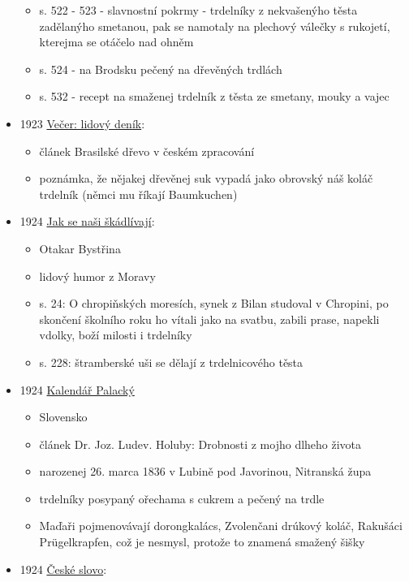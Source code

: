 \begin{itemize}
  \begin{itemize}
  \tightlist
  \item
    s. 522 - 523 - slavnostní pokrmy - trdelníky z nekvašenýho těsta
    zadělanýho smetanou, pak se namotaly na plechový válečky s rukojetí,
    kterejma se otáčelo nad ohněm
  \item
    s. 524 - na Brodsku pečený na dřevěných trdlách
  \item
    s. 532 - recept na smaženej trdelník z těsta ze smetany, mouky a
    vajec
  \end{itemize}
\item
  1923
  \href{https://ceskadigitalniknihovna.cz/uuid/uuid:6ef4c460-b7b1-11e9-8f08-5ef3fc9ae867}{Večer:
  lidový deník}:

  \begin{itemize}
  \tightlist
  \item
    článek Brasilské dřevo v českém zpracování
  \item
    poznámka, že nějakej dřevěnej suk vypadá jako obrovský náš koláč
    trdelník (němci mu říkají Baumkuchen)
  \end{itemize}
\item
  1924
  \href{https://ceskadigitalniknihovna.cz/uuid/uuid:2dbf7a20-4967-11e4-aded-005056827e51}{Jak
  se naši škádlívají}:

  \begin{itemize}
  \tightlist
  \item
    Otakar Bystřina
  \item
    lidový humor z Moravy
  \item
    s. 24: O chropiňských moresích, synek z Bilan studoval v Chropini,
    po skončení školního roku ho vítali jako na svatbu, zabili prase,
    napekli vdolky, boží milosti i trdelníky
  \item
    s. 228: štramberské uši se dělají z trdelnicového těsta
  \end{itemize}
\item
  1924
  \href{https://ceskadigitalniknihovna.cz/view/uuid:f0cbc280-f31d-11ed-8fba-005056827e51?page=uuid\%3A7d79e78f-ae5e-497a-8be8-419105a6b0f9&fulltext=trdeln\%C3\%ADky&source=mzk}{Kalendář
  Palacký}

  \begin{itemize}
  \tightlist
  \item
    Slovensko
  \item
    článek Dr. Joz. Ludev. Holuby: Drobnosti z mojho dlheho života
  \item
    narozenej 26. marca 1836 v Lubině pod Javorinou, Nitranská župa
  \item
    trdelníky posypaný ořechama s cukrem a pečený na trdle
  \item
    Maďaři pojmenovávají dorongkalács, Zvolenčani drúkový koláč,
    Rakušáci Prügelkrapfen, což je nesmysl, protože to znamená smažený
    šišky
  \end{itemize}
\item
  1924
  \href{https://ceskadigitalniknihovna.cz/uuid/uuid:a382bc3a-7825-4663-992a-f6e93b38a656}{České
  slovo}:


\end{itemize}
